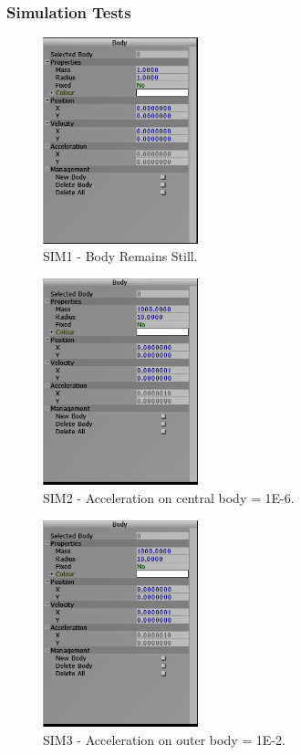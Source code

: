 \subsubsection{Simulation Tests}

\begin{figure}[H]
  \centering
  \includegraphics[width=0.4\textwidth]{img/testingEvidence/sim1.png}
  \caption{SIM1 - Body Remains Still.}
\end{figure}

\begin{figure}[H]
  \centering
  \includegraphics[width=0.4\textwidth]{img/testingEvidence/sim2.png}
  \caption{SIM2 - Acceleration on central body = 1E-6.}
\end{figure}

\begin{figure}[H]
  \centering
  \includegraphics[width=0.4\textwidth]{img/testingEvidence/sim2.png}
  \caption{SIM3 - Acceleration on outer body = 1E-2.}
\end{figure}

